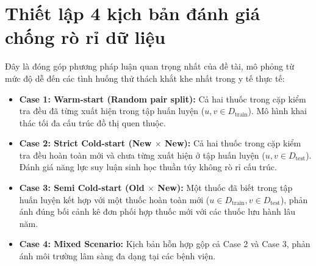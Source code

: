 \documentclass[12pt,a4paper,oneside]{report}
\begin{document}
\section{Thiết lập 4 kịch bản đánh giá chống rò rỉ dữ liệu}
Đây là đóng góp phương pháp luận quan trọng nhất của đề tài, mô phỏng từ mức độ dễ đến các tình huống thử thách khắt khe nhất trong y tế thực tế:
\begin{itemize}
  \item \textbf{Case 1: Warm-start (Random pair split):} Cả hai thuốc trong cặp kiểm tra đều đã từng xuất hiện trong tập huấn luyện ($u, v \in D_{\text{train}}$). Mô hình khai thác tối đa cấu trúc đồ thị quen thuộc.
  \item \textbf{Case 2: Strict Cold-start (New $\times$ New):} Cả hai thuốc trong cặp kiểm tra đều hoàn toàn mới và chưa từng xuất hiện ở tập huấn luyện ($u, v \in D_{\text{test}}$). Đánh giá năng lực suy luận sinh học thuần túy không rò rỉ cấu trúc.
  \item \textbf{Case 3: Semi Cold-start (Old $\times$ New):} Một thuốc đã biết trong tập huấn luyện kết hợp với một thuốc hoàn toàn mới ($u \in D_{\text{train}}, v \in D_{\text{test}}$), phản ánh đúng bối cảnh kê đơn phối hợp thuốc mới với các thuốc lưu hành lâu năm.
  \item \textbf{Case 4: Mixed Scenario:} Kịch bản hỗn hợp gộp cả Case 2 và Case 3, phản ánh môi trường lâm sàng đa dạng tại các bệnh viện.
\end{itemize}
\end{document}
